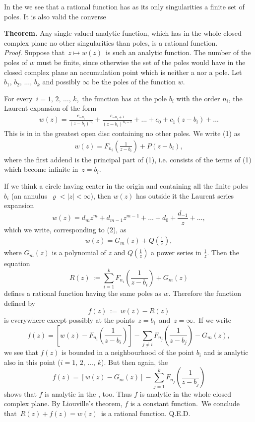 \documentclass[12pt]{article}
\theoremstyle{definition}
\begin{document}
In the  we see that a rational function has as its only singularities a finite set of poles.  It is also valid the converse

\textbf{Theorem.}  Any single-valued analytic function, which has in the whole closed complex plane no other singularities than poles, is a rational function.\\

{\em Proof.}  Suppose that\, $z\mapsto w(z)$\, is such an analytic function.  The number of the poles of $w$ must be finite, since otherwise the set of the poles would have in the closed complex plane an accumulation point which is neither a  nor a pole.  Let $b_1,\,b_2,\,\ldots,\,b_k$ and possibly $\infty$ be the poles of the function $w$.

For every\, $i = 1,\,2,\,\ldots,\,k$,\, the function has at the pole $b_i$ with the order $n_i$, the Laurent expansion of the form
\begin{align}
  w(z) = \frac{c_{-n_i}}{(z-b_i)^{n_i}}+\frac{c_{-n_i+1}}{(z-b_i)^{n_i-1}}+\ldots+c_0+c_1(z-b_i)+\ldots
\end{align}
This is in  in the greatest open disc containing no other poles.  We write (1) as
\begin{align}
  w(z) = F_{n_i}\!\left(\frac{1}{z-b_i}\right)+P(z-b_i),
\end{align}
where the first addend is the principal part of (1), i.e. consists of the terms of (1) which become infinite in\, $z = b_i$.

If we think a circle having center in the origin and containing all the finite poles $b_i$ (an annulus\, 
$\varrho < |z| < \infty$), then $w(z)$ has outside it the Laurent series expansion
$$w(z) = d_mz^m+d_{m-1}z^{m-1}+\ldots+d_0+\frac{d_{-1}}{z}+\ldots,$$
which we write, corresponding to (2), as
\begin{align}
  w(z) = G_m(z)+Q\!\left(\frac{1}{z}\right)\!,
\end{align}
where $G_m(z)$ is a polynomial of $z$ and $Q\left(\frac{1}{z}\right)$ a power series in $\frac{1}{z}$.  Then the equation
$$R(z)\, := \sum_{i=1}^kF_{n_i}\!\left(\frac{1}{z-b_i}\right)+G_m(z)$$
defines a rational function having the same poles as $w$.  Therefore the function defined by
$$f(z)\, :=\, w(z)-R(z)$$
is  everywhere except possibly at the points\, $z = b_i$\, and\, $z = \infty$.\, If we write
$$f(z) = 
\left[w(z)-F_{n_i}\!\left(\frac{1}{z-b_i}\right)\right]-\sum_{j\neq i}F_{n_j}\!\left(\frac{1}{z-b_j}\right)-G_m(z),$$
we see that $f(z)$ is bounded in a neighbourhood of the point $b_i$ and is analytic also in this point ($i = 1,\,2,\,\ldots,\,k$).  But then again, the  
$$f(z) = 
\left[w(z)-G_m(z)\right]-\sum_{j=1}^kF_{n_j}\!\left(\frac{1}{z-b_j}\right)$$
shows that $f$ is analytic in the , too.  Thus $f$ is analytic in the whole closed complex plane.  By Liouville's theorem, $f$ is a constant function.\, We conclude that\, $R(z)+f(z) = w(z)$\, is a rational function. Q.E.D.\\
\end{document}
